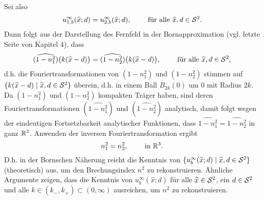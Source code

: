 Sei also
\begin{equation*}
	u_{1,b}^\infty(\widehat{x};d)=u_{2,b}^\infty(\widehat{x};d),\qquad\text{ für alle }\widehat{x},d\in\mathcal{S}^2.
\end{equation*}
Dann folgt aus der Darstellung des Fernfeld in der Bornapproximation (vgl. letzte Seite von Kapitel 4), dass
\begin{equation*}
	(\widehat{1-n_1^2})\big(k(\widehat{x}-d)\big)=\widehat{(1-n_2^2)}\big(k(\widehat{x}-d)\big),\qquad\text{ für alle }\widehat{x},d\in\mathcal{S}^2,
\end{equation*}
d.h. die Fouriertransformationen von \((1-n_1^2)\) und \((1-n_2^2)\) stimmen auf \(\{k(\widehat{x}-d)\mid\widehat{x},d\in\mathcal{S}^2\}\) überein, d.h. in einem Ball \(B_{2k}(0)\) um \(0\) mit Radius \(2k\). Da \((1-n_1^2)\) und \((1-n_2^2)\) kompakten Träger haben, sind deren Fouriertransformationen \((\widehat{1-n_1^2})\) und \((\widehat{1-n_2^2})\) analytisch, damit folgt wegen der eindeutigen Fortsetzbarkeit analytischer Funktionen, dass \(\widehat{1-n_1^2}=\widehat{1-n_2^2}\) in ganz \(\mathbb{R}^3\). Anwenden der inversen Fouriertransformation ergibt
\begin{equation*}
	n_1^2=n_2^2,\qquad\text{ in }\mathbb{R}^3.
\end{equation*}
D.h. in der Bornschen Näherung reicht die Kenntnis von \(\{u_b^\infty(\widehat{x};d)\mid\widehat{x},d\in\mathcal{S}^2\}\) (theoretisch) aus, um den Brechungsindex \(n^2\) zu rekonstruieren. Ähnliche Argumente zeigen, dass die Kenntnis von \(u_b^\infty(\widehat{x};d)\) für alle \(\widehat{x}\in\mathcal{S}^2\), ein \(d\in\mathcal{S}^2\) und alle \(k\in(k_-,k_+)\subset(0,\infty)\) ausreichen, um \(n^2\) zu rekonstruieren.\vspace{1.5mm}

